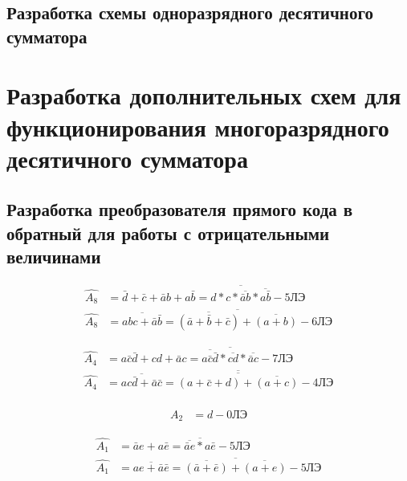 \documentclass[a4paper,14pt]{article}
\begin{document}
\subsection{Разработка схемы одноразрядного десятичного сумматора}

\section{Разработка дополнительных схем для функционирования многоразрядного десятичного сумматора}

\subsection{Разработка преобразователя прямого кода в обратный для работы с отрицательными величинами}

\begin{equation*}
\begin{aligned}
\widehat{A_8} &= \bar{d} + \bar{c} + \bar{a}b + a\bar{b} = \overline{d*c*\overline{\bar{a}b}*\overline{a\bar{b}}} - \text{5ЛЭ} \\
\widehat{A_8} &= \overline{abc+\bar{a}\bar{b}} = \overline{\overline{(\bar{a}+\bar{b}+\bar{c})}+\overline{(a+b)}} - \text{6ЛЭ}
\end{aligned}
\end{equation*}

\begin{equation*}
\begin{aligned}
\widehat{A_4} &= a\bar{c}\bar{d} + cd + \bar{a}c = \overline{\overline{a\bar{c}\bar{d}}*\overline{cd}*\overline{\bar{a}c}} - \text{7ЛЭ} \\
\widehat{A_4} &= \overline{ac\bar{d} + \bar{a}\bar{c}}  = 
\overline{\overline{(a+\bar{c}+d)+\overline{(a+c)}}}- \text{4ЛЭ}
\end{aligned}
\end{equation*}

\begin{equation*}
\begin{aligned}
\widehat{A_2} &= d - \text{0ЛЭ}
\end{aligned}
\end{equation*}

\begin{equation*}
\begin{aligned}
\widehat{A_1} &= \bar{a}e + a\bar{e} = \overline{\overline{\bar{a}e}*a\bar{e}} - \text{5ЛЭ} \\
\widehat{A_1} &= \overline{ae+\bar{a}\bar{e}} = \overline{\overline{(\bar{a}+\bar{e})}+\overline{(a+e)}} - \text{5ЛЭ}
\end{aligned}
\end{equation*}
\end{document}
